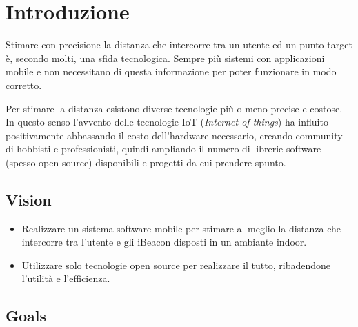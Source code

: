 \chapter{Introduzione}

	Stimare con precisione la distanza che intercorre tra un utente ed un punto target è, secondo molti, una sfida tecnologica. Sempre più sistemi	 con applicazioni mobile e non necessitano di questa informazione per poter funzionare in modo corretto. 
	
	Per stimare la distanza esistono diverse tecnologie più o meno precise e costose. In questo senso l'avvento delle tecnologie IoT (\textit{Internet of things}) ha influito positivamente abbassando il costo dell'hardware necessario, creando community di hobbisti e professionisti, quindi ampliando il numero di librerie software (spesso open source) disponibili e progetti da cui prendere spunto.
	
\section{Vision}

\begin{itemize}
	\item Realizzare un sistema software mobile per stimare al meglio la distanza che intercorre tra l'utente e gli iBeacon disposti in un ambiante indoor.
	
	\item Utilizzare solo tecnologie open source per realizzare il tutto, ribadendone l'utilità e l'efficienza.
\end{itemize}

\section{Goals}
